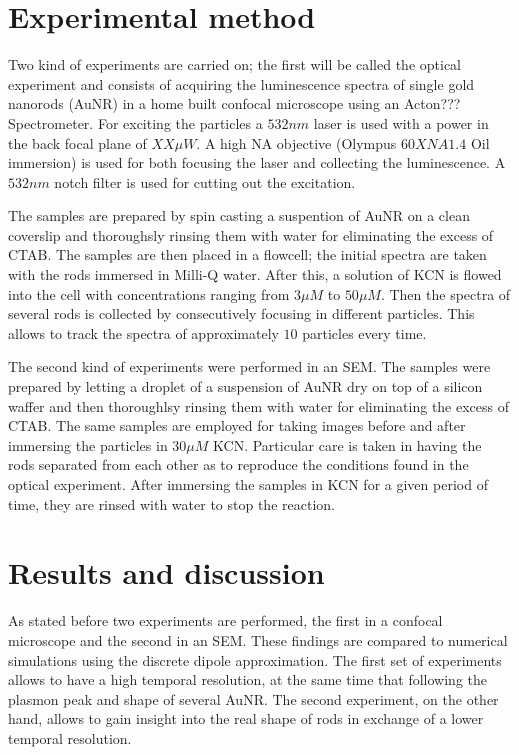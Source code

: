 \documentclass[twocolumn]{article}
\begin{document}
\section{Experimental method}
Two kind of experiments are carried on; the first will be called the optical
experiment and consists of acquiring the luminescence spectra of single gold
nanorods (AuNR) in a home built confocal microscope using an
Acton??? Spectrometer. For exciting the particles a $532nm$ laser is used with
a power in the back focal plane of $XX\mu W$. A high NA objective (Olympus $60X
NA 1.4$ Oil immersion) is used for both focusing the laser and collecting the
luminescence. A $532nm$ notch filter is used for cutting out the excitation. 

The samples are prepared by spin casting a suspention of AuNR on a clean
coverslip and thoroughsly rinsing them  with water for eliminating the excess of
CTAB. The samples are then placed in a flowcell; the initial spectra are taken
with the rods immersed in Milli-Q water. After this, a solution of KCN is flowed
into the cell with concentrations ranging from $3\mu M$ to $50\mu M$. Then the
spectra of several rods is collected by consecutively focusing in different
particles. This allows to track the spectra of approximately $10$ particles
every time.

The second kind of experiments were performed in an SEM. The samples
were prepared by letting a droplet of a suspension of AuNR dry on top of a
silicon waffer and then thoroughlsy rinsing them with water for eliminating the
excess of CTAB. The same samples are employed for taking images before and after
immersing the particles in $30\mu M$ KCN. Particular care is taken in having the
rods separated from each other as to reproduce the conditions found in the
optical experiment. After immersing the samples in KCN for a given period of
time, they are rinsed with water to stop the reaction.


\section{Results and discussion}
As stated before two experiments are performed, the first in a
confocal microscope and the second in an SEM. These findings are compared to
numerical simulations using the discrete dipole approximation. The first set of
experiments allows to have a high temporal resolution, at the same time that
following the plasmon peak and shape of several AuNR. The second experiment, on
the other hand, allows to gain insight into the real shape of rods in exchange
of a lower temporal resolution. 
\end{document}
